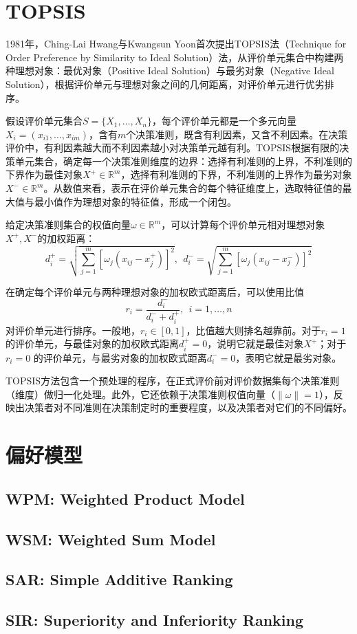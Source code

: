 \chapter{TOPSIS}
1981年，Ching-Lai Hwang与Kwangsun Yoon\cite{hwang1981multiple}首次提出TOPSIS法（Technique for Order Preference by Similarity to Ideal Solution）法，从评价单元集合中构建两种理想对象：最优对象（Positive Ideal Solution）与最劣对象（Negative Ideal Solution），根据评价单元与理想对象之间的几何距离，对评价单元进行优劣排序。

假设评价单元集合$S=\{X_1,\ldots,X_n\}$，每个评价单元都是一个多元向量$X_i=(x_{i1},\ldots,x_{im})$，含有$m$个决策准则，既含有利因素，又含不利因素。在决策评价中，有利因素越大而不利因素越小对决策单元越有利。TOPSIS根据有限的决策单元集合，确定每一个决策准则维度的边界：选择有利准则的上界，不利准则的下界作为最佳对象$X^+\in\mathbb{R}^m$，选择有利准则的下界，不利准则的上界作为最劣对象$X^-\in\mathbb{R}^m$。从数值来看，表示在评价单元集合的每个特征维度上，选取特征值的最大值与最小值作为理想对象的特征值，形成一个闭包。

给定决策准则集合的权值向量$\omega\in\mathbb{R}^m$，可以计算每个评价单元相对理想对象$X^+,X^-$的加权距离：
\begin{equation}
  d_i^+ = \sqrt{\sum\limits_{j=1}^m [\omega_j(x_{ij} - x_j^+)]^2},~~
  d_i^- = \sqrt{\sum\limits_{j=1}^m [\omega_j(x_{ij} - x_j^-)]^2}
\end{equation}

在确定每个评价单元与两种理想对象的加权欧式距离后，可以使用比值
\begin{equation}
    r_i = \frac{d_i^-}{d_i^- + d_i^+},~~i=1,\ldots,n
\end{equation}
对评价单元进行排序。一般地，$r_i\in[0,1]$，比值越大则排名越靠前。对于$r_i=1$的评价单元，与最佳对象的加权欧式距离$d_i^+=0$，说明它就是最佳对象$X^+$；对于$r_i=0$ 的评价单元，与最劣对象的加权欧式距离$d_i^-=0$，表明它就是最劣对象。

TOPSIS方法包含一个预处理的程序，在正式评价前对评价数据集每个决策准则（维度）做归一化处理。此外，它还依赖于决策准则权值向量（$\|\omega\|=1$），反映出决策者对不同准则在决策制定时的重要程度，以及决策者对它们的不同偏好。

\chapter{偏好模型}
\section{WPM: Weighted Product Model}
\section{WSM: Weighted Sum Model}
\section{SAR: Simple Additive Ranking}
\section{SIR: Superiority and Inferiority Ranking}
